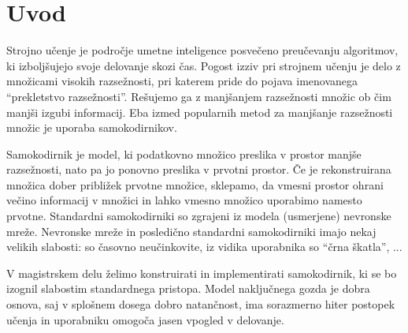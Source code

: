 \documentclass[12pt,a4paper,twoside]{article}
\theoremstyle{definition} %
\theoremstyle{plain} %
\numberwithin{equation}{section}  %
\begin{document}


\section{Uvod}



Strojno učenje je področje umetne inteligence posvečeno preučevanju algoritmov, ki izboljšujejo svoje delovanje skozi čas.
Pogost izziv pri strojnem učenju je delo z množicami visokih razsežnosti, pri katerem pride do pojava imenovanega ``prekletstvo razsežnosti''.
Rešujemo ga z manjšanjem razsežnosti množic ob čim manjši izgubi informacij.
Eba izmed popularnih metod za manjšanje razsežnosti množic je uporaba samokodirnikov.

Samokodirnik je model, ki podatkovno množico preslika v prostor manjše razsežnosti, nato pa jo ponovno preslika v prvotni prostor. %
Če je rekonstruirana množica dober približek prvotne množice, sklepamo, da vmesni prostor ohrani večino informacij v množici in lahko vmesno množico uporabimo namesto prvotne. %
Standardni samokodirniki so zgrajeni iz modela (usmerjene) nevronske mreže.
Nevronske mreže in posledično standardni samokodirniki imajo nekaj velikih slabosti: so časovno neučinkovite, iz vidika uporabnika so ``črna škatla'', ...

V magistrskem delu želimo konstruirati in implementirati samokodirnik, ki se bo izognil slabostim standardnega pristopa.
Model naključnega gozda je dobra osnova, saj v splošnem dosega dobro natančnost, ima sorazmerno hiter postopek učenja in uporabniku omogoča jasen vpogled v delovanje.
\end{document}
